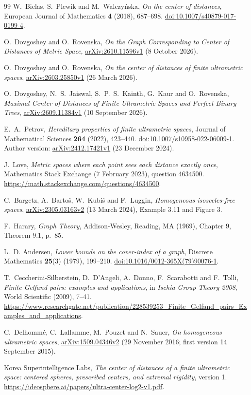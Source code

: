 \documentclass[11pt]{article}
\begin{document}
\begin{thebibliography}{99}
W.~Bielas, S.~Plewik and M.~Walczy\'nska,
\emph{On the center of distances}, European Journal of Mathematics
\textbf{4} (2018), 687--698.
\href{https://doi.org/10.1007/s40879-017-0199-4}{doi:10.1007/s40879-017-0199-4}.

O.~Dovgoshey and O.~Rovenska,
\emph{On the Graph Corresponding to Center of Distances of Metric Space},
\href{https://arxiv.org/abs/2610.11596v1}{arXiv:2610.11596v1}
(8 October 2026).

O.~Dovgoshey and O.~Rovenska,
\emph{On the center of distances of finite ultrametric spaces},
\href{https://arxiv.org/abs/2603.25850v1}{arXiv:2603.25850v1}
(26 March 2026).

O.~Dovgoshey, N.~S.~Jaiswal, S.~P.~S.~Kainth, G.~Kaur and O.~Rovenska,
\emph{Maximal Center of Distances of Finite Ultrametric Spaces and
Perfect Binary Trees},
\href{https://arxiv.org/abs/2609.11384v1}{arXiv:2609.11384v1}
(10 September 2026).

E.~A.~Petrov,
\emph{Hereditary properties of finite ultrametric spaces},
Journal of Mathematical Sciences \textbf{264} (2022), 423--440.
\href{https://doi.org/10.1007/s10958-022-06009-1}{doi:10.1007/s10958-022-06009-1}.
Author version:
\href{https://arxiv.org/abs/2412.17421v1}{arXiv:2412.17421v1}
(23 December 2024).

J.~Love,
\emph{Metric spaces where each point sees each distance exactly once},
Mathematics Stack Exchange (7 February 2023), question 4634500.
\url{https://math.stackexchange.com/questions/4634500}.

C.~Bargetz, A.~Barto\v{s}, W.~Kubi\'s and F.~Luggin,
\emph{Homogeneous isosceles-free spaces},
\href{https://arxiv.org/abs/2305.03163v2}{arXiv:2305.03163v2}
(13 March 2024), Example 3.11 and Figure 3.

F.~Harary, \emph{Graph Theory}, Addison-Wesley, Reading, MA (1969),
Chapter 9, Theorem 9.1, p.~85.

L.~D. Andersen, \emph{Lower bounds on the cover-index of a graph},
Discrete Mathematics \textbf{25}(3) (1979), 199--210.
\href{https://doi.org/10.1016/0012-365X(79)90076-1}{doi:10.1016/0012-365X(79)90076-1}.

T.~Ceccherini-Silberstein, D.~D'Angeli, A.~Donno, F.~Scarabotti and F.~Tolli,
\emph{Finite Gelfand pairs: examples and applications},
in \emph{Ischia Group Theory 2008}, World Scientific (2009), 7--41.
\url{https://www.researchgate.net/publication/228539253_Finite_Gelfand_pairs_Examples_and_applications}.

C.~Delhomm\'e, C.~Laflamme, M.~Pouzet and N.~Sauer,
\emph{On homogeneous ultrametric spaces},
\href{https://arxiv.org/abs/1509.04346v2}{arXiv:1509.04346v2}
(29 November 2016; first version 14 September 2015).

Korea Superintelligence Labs,
\emph{The center of distances of a finite ultrametric space:
centered spheres, prescribed centers, and extremal rigidity}, version 1.
\url{https://ideosphere.ai/papers/ultra-center-log2-v1.pdf}.
\end{thebibliography}
\end{document}
